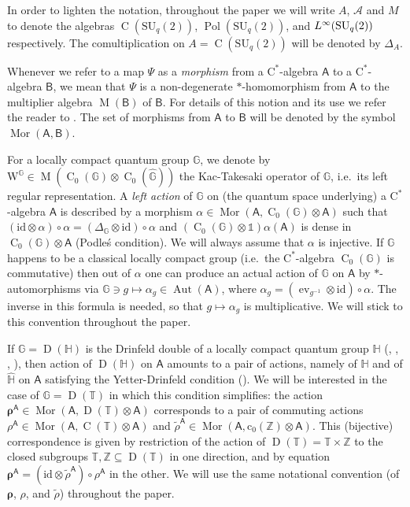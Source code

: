 \documentclass[12pt,reqno,a4paper]{amsart}
\theoremstyle{definition}
\newcommand{\cst}{\ensuremath{\mathrm{C}^*}}
\newcommand{\comp}{\circ}
\newcommand{\hh}[1]{\widehat{#1}}
\newcommand{\I}{\mathds{1}}
\newcommand{\id}{\mathrm{id}}
\newcommand{\tens}{\otimes}
\newcommand{\GG}{\mathbb{G}}
\newcommand{\HH}{\mathbb{H}}
\newcommand{\TT}{\mathbb{T}}
\newcommand{\ZZ}{\mathbb{Z}}
\newcommand{\cA}{\mathscr{A}}
\newcommand{\sA}{\mathsf{A}}
\newcommand{\sB}{\mathsf{B}}
\newcommand{\brho}{{\boldsymbol{\rho}}}
\newcommand{\ww}{\mathrm{W}}
\DeclareMathOperator{\C}{C}
\DeclareMathOperator{\D}{D}
\DeclareMathOperator{\Linf}{\mathnormal{L}^{\infty}}
\DeclareMathOperator{\M}{M}
\DeclareMathOperator{\Mor}{Mor}
\DeclareMathOperator{\Pol}{Pol}
\newcommand{\SU}{\mathrm{SU}}
\numberwithin{equation}{section}
\begin{document}
In order to lighten the notation, throughout the paper we will write $A$, $\cA$ and $M$ to denote the algebras $\C(\SU_q(2))$, $\Pol(\SU_q(2))$, and $\Linf(\SU_q(2))$ respectively. The comultiplication on $A=\C(\SU_q(2))$ will be denoted by $\Delta_A$.

Whenever we refer to a map $\Psi$ as a \emph{morphism} from a \cst-algebra $\sA$ to a \cst-algebra $\sB$, we mean that $\Psi$ is a non-degenerate $*$-homomorphism from $\sA$ to the multiplier algebra $\M(\sB)$ of $\sB$. For details of this notion and its use we refer the reader to \cite{unbo,Lance}. The set of morphisms from $\sA$ to $\sB$ will be denoted by the symbol $\Mor(\sA,\sB)$.

For a  locally compact quantum group $\GG$, we denote by $\ww^{\GG}\in\M(\C_0(\GG)\tens\C_0(\hh{\GG}))$ the Kac-Takesaki operator of $\GG$, i.e.~its left regular representation. A \emph{left action} of $\GG$ on (the quantum space underlying) a \cst-algebra $\sA$ is described by a morphism $\alpha\in\Mor(\sA,\C_0(\GG)\tens\sA)$ such that $(\id\tens\alpha)\comp\alpha=(\Delta_\GG\tens\id)\comp\alpha$ and $(\C_0(\GG)\tens\I)\alpha(\sA)$ is dense in $\C_0(\GG)\tens\sA$ (Podle\'s condition). We will always assume that $\alpha$ is injective. If $\GG$ happens to be a classical locally compact group (i.e.~the \cst-algebra $\C_0(\GG)$ is commutative) then out of $\alpha$ one can produce an actual action of $\GG$ on $\sA$ by $*$-automorphisms via $\GG\ni g\mapsto\alpha_g\in\operatorname{Aut}(\sA)$, where $\alpha_g=(\operatorname{ev}_{g^{-1}}\tens\id)\comp\alpha$. The inverse in this formula is needed, so that $g\mapsto\alpha_g$ is multiplicative. We will stick to this convention throughout the paper.

If $\GG=\D(\HH)$ is the Drinfeld double of a locally compact quantum group $\HH$ (\cite[Section 4]{PodlesWoronowiczQLG}, \cite{Yamanouchi}, \cite[Section 8]{mnw}, \cite[Section 8]{BaajVaes}), then action of $\D(\HH)$ on $\sA$ amounts to a pair of actions, namely of $\HH$ and of $\hh{\HH}$ on $\sA$ satisfying the Yetter-Drinfeld condition (\cite[Proposition 3.2]{NestVoigt}). We will be interested in the case of $\GG=\D(\TT)$ in which this condition simplifies: the action $\brho^{\sA}\in\Mor(\sA,\D(\TT)\tens\sA)$ corresponds to a pair of commuting actions $\rho^{\sA}\in\Mor(\sA,\C(\TT)\tens\sA)$ and $\tilde{\rho}^{\sA}\in\Mor(\sA,\mathrm{c}_0(\ZZ)\tens\sA)$. This (bijective) correspondence is given by restriction of the action of $\D(\TT)=\TT\times\ZZ$ to the closed subgroups $\TT,\ZZ\subseteq\D(\TT)$ in one direction, and by equation $\brho^{\sA}=(\id\tens\tilde{\rho}^{\sA})\comp\rho^{\sA}$ in the other. We will use the same notational convention (of $\brho$, $\rho$, and $\tilde{\rho}$) throughout the paper.
\end{document}
